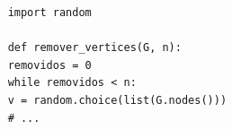 \begin{algorithm}
\begin{verbatim}
	import random
	
	def remover_vertices(G, n):
	removidos = 0
	while removidos < n:
	v = random.choice(list(G.nodes()))
	# ...
\end{verbatim}
\end{algorithm}
